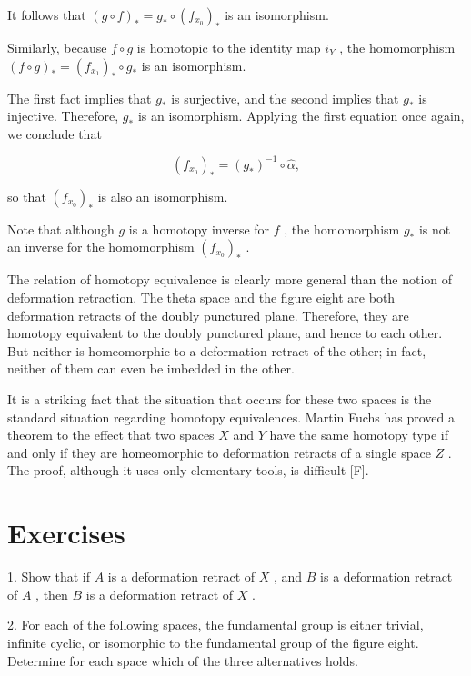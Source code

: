 \documentclass[10pt]{article}
\begin{document}
It follows that \({\left( g \circ  f\right) }_{ * } = {g}_{ * } \circ  {\left( {f}_{{x}_{0}}\right) }_{ * }\) is an isomorphism.

Similarly, because \(f \circ  g\) is homotopic to the identity map \({i}_{Y}\) , the homomorphism \({\left( f \circ  g\right) }_{ * } = {\left( {f}_{{x}_{1}}\right) }_{ * } \circ  {g}_{ * }\) is an isomorphism.

The first fact implies that \({g}_{ * }\) is surjective, and the second implies that \({g}_{ * }\) is injective. Therefore, \({g}_{ * }\) is an isomorphism. Applying the first equation once again, we conclude that

\[
{\left( {f}_{{x}_{0}}\right) }_{ * } = {\left( {g}_{ * }\right) }^{-1} \circ  \widehat{\alpha },
\]

so that \({\left( {f}_{{x}_{0}}\right) }_{ * }\) is also an isomorphism.

Note that although \(g\) is a homotopy inverse for \(f\) , the homomorphism \({g}_{ * }\) is not an inverse for the homomorphism \({\left( {f}_{{x}_{0}}\right) }_{ * }\) .

The relation of homotopy equivalence is clearly more general than the notion of deformation retraction. The theta space and the figure eight are both deformation retracts of the doubly punctured plane. Therefore, they are homotopy equivalent to the doubly punctured plane, and hence to each other. But neither is homeomorphic to a deformation retract of the other; in fact, neither of them can even be imbedded in the other.

It is a striking fact that the situation that occurs for these two spaces is the standard situation regarding homotopy equivalences. Martin Fuchs has proved a theorem to the effect that two spaces \(X\) and \(Y\) have the same homotopy type if and only if they are homeomorphic to deformation retracts of a single space \(Z\) . The proof, although it uses only elementary tools, is difficult [F].

\section*{Exercises}

1. Show that if \(A\) is a deformation retract of \(X\) , and \(B\) is a deformation retract of \(A\) , then \(B\) is a deformation retract of \(X\) .

2. For each of the following spaces, the fundamental group is either trivial, infinite cyclic, or isomorphic to the fundamental group of the figure eight. Determine for each space which of the three alternatives holds.
\end{document}
